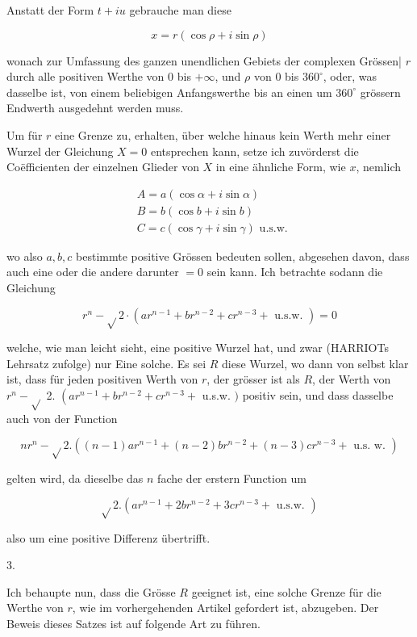 \documentclass[twoside,12pt, showframe]{memoir}
\begin{document}
Anstatt der Form \(t+i u\) gebrauche man diese

\[
x=r(\cos \rho+i \sin \rho)
\]

wonach zur Umfassung des ganzen unendlichen Gebiets der complexen Grössen| \(r\) durch alle positiven Werthe von 0 bis \(+\infty\), und \(\rho\) von 0 bis \(360^{\circ}\), oder, was
dasselbe ist, von einem beliebigen Anfangswerthe bis an einen um \(360^{\circ}\) grössern Endwerth ausgedehnt werden muss.

Um für \(r\) eine Grenze zu, erhalten, über welche hinaus kein Werth mehr einer Wurzel der Gleichung \(X=0\) entsprechen kann, setze ich zuvörderst die Coëfficienten der einzelnen Glieder von \(X\) in eine ähnliche Form, wie \(x\), nemlich

\[
\begin{aligned}
& A=a(\cos \alpha+i \sin \alpha) \\
& B=b(\cos b+i \sin b) \\
& C=c(\cos \gamma+i \sin \gamma) \text { u.s.w. }
\end{aligned}
\]

wo also \(a, b, c\) bestimmte positive Grössen bedeuten sollen, abgesehen davon, dass auch eine oder die andere darunter \(=0\) sein kann. Ich betrachte sodann die Gleichung

\[
r^{n}-\sqrt{ } 2 \cdot\left(a r^{n-1}+b r^{n-2}+c r^{n-3}+\text { u.s.w. }\right)=0
\]

welche, wie man leicht sieht, eine positive Wurzel hat, und zwar (HARRIOTs Lehrsatz zufolge) nur Eine solche. Es sei \(R\) diese Wurzel, wo dann von selbst klar ist, dass für jeden positiven Werth von \(r\), der grösser ist als \(R\), der Werth von \(r^{n}-\sqrt{ }\) 2. \(\left(a r^{n-1}+b r^{n-2}+c r^{n-3}+\right.\) u.s.w. \()\) positiv sein, und dass dasselbe auch von der Function

\[
n r^{n}-\sqrt{ } 2 .\left((n-1) a r^{n-1}+(n-2) b r^{n-2}+(n-3) c r^{n-3}+\text { u.s. w. }\right)
\]

gelten wird, da dieselbe das \(n\) fache der erstern Function um

\[
\sqrt{ } 2 .\left(a r^{n-1}+2 b r^{n-2}+3 c r^{n-3}+\text { u.s.w. }\right)
\]

also um eine positive Differenz übertrifft.

3.

Ich behaupte nun, dass die Grösse \(R\) geeignet ist, eine solche Grenze für die Werthe von \(r\), wie im vorhergehenden Artikel gefordert ist, abzugeben. Der Beweis dieses Satzes ist auf folgende Art zu führen.
\end{document}
